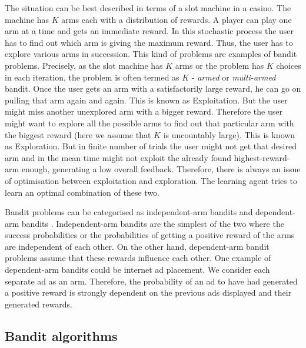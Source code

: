 \documentclass[english]{tktltiki}
\begin{document}
The situation can be best described in terms of a slot machine in a casino. The machine has $K$ arms each with a distribution of rewards. A player can play one arm at a time and gets an immediate reward. In this stochastic process the user has to find out which arm is giving the maximum reward. Thus, the user has to explore various arms in succession. This kind of problems are examples of bandit problems. Precisely, as the slot machine has $K$ arms or the problem has $K$ choices in each iteration, the problem is often termed as $K$ - \textit{armed} or \textit{multi-armed} bandit. Once the user gets an arm with a satisfactorily large reward, he can go on pulling that arm again and again. This is known as Exploitation. But the user might miss another unexplored arm with a bigger reward. Therefore the user might want to explore all the possible arms to find out that particular arm with the biggest reward (here we assume that $K$ is uncountably large). This is known as Exploration. But in finite number of trials the user might not get that desired arm and in the mean time might not exploit the already found highest-reward-arm enough, generating a low overall feedback. Therefore, there is always an issue of optimisation between exploitation and exploration. The learning agent tries to learn an optimal combination of these two.

Bandit problems can be categorised as independent-arm bandits \cite{independent_arm_bandits_1, independent_arm_bandits_2} and dependent-arm bandits \cite{dependent_arm_bandits}. Independent-arm bandits are the simplest of the two where the success probabilities or the probabilities of getting a positive reward of the arms are independent of each other. On the other hand, dependent-arm bandit problems assume that these rewards influence each other. One example of dependent-arm bandits could be internet ad placement. We consider each separate ad as an arm. Therefore, the probability of an ad to have had generated a positive reward is strongly dependent on the previous ads displayed and their generated rewards.

\subsection{Bandit algorithms}
\end{document}
